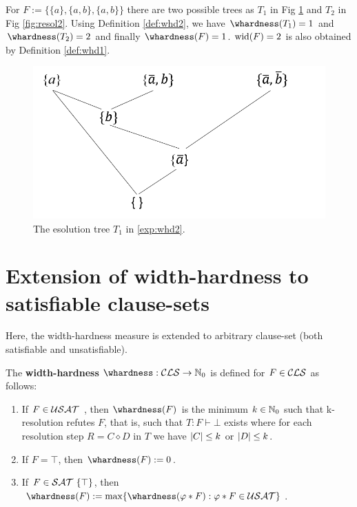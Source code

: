 \documentclass[12pt]{book}
\begin{document}
\begin{examp}\label{exp:whd2}
      For $F := \{\{a\}, \{a, b\}, \{a, b\}\}$ there are two possible trees as $T_1$ in Fig \ref{fig:whd2} and $T_2$ in Fig \ref{fig:resol2}.   
	  Using Definition \ref{def:whd2}, we have $\whardness(T_1) = 1$ and $\whardness(T_2) = 2$ and finally $\whardness(F) = 1$. $\operatorname{wid}(F) = 2$ is also 
	  obtained by Definition \ref{def:whd1}.
	  \begin{figure}
      \begin{center}
      \includegraphics[scale =0.6]{whd1.png}
      \caption{The esolution tree $T_1$ in \ref{exp:whd2}.}
	  \label{fig:whd2}
      \end{center}
      \end{figure}
\end{examp}
\section{Extension of width-hardness to satisfiable clause-sets}
\label{sec:extensionWidth-hardness}
Here, the width-hardness measure is extended to arbitrary clause-set (both satisfiable and unsatisfiable). 

\begin{defi}\label{def:ex-whd}  
      \cite{h11} The \textbf{width-hardness} $\whardness : \Cls \rightarrow \NNZ$  is defined for $F \in \mathcal{CLS}$ as follows:
	  \begin{enumerate}
              \item If $F \in \mathcal{USAT}$ , then $\whardness(F)$ is the minimum $k \in \mathbb{N}_0$ such that k-resolution refutes $F$, that is, such that
			  $T : F \vdash \bot$ exists where for each resolution step $R = C  \diamond D$ in $T$ we have $ \lvert C  \rvert \leq k$ or $\lvert D  \rvert \leq k$.
			  \item If $F = \top$, then $\whardness(F) := 0$.
			  \item If $F \in \mathcal{SAT} \ \{ \top \}$, then $\whardness(F) := \max \{\whardness(\varphi * F) : \varphi * F \in \Usat\}$.
      \end{enumerate}
\end{defi}
\end{document}
